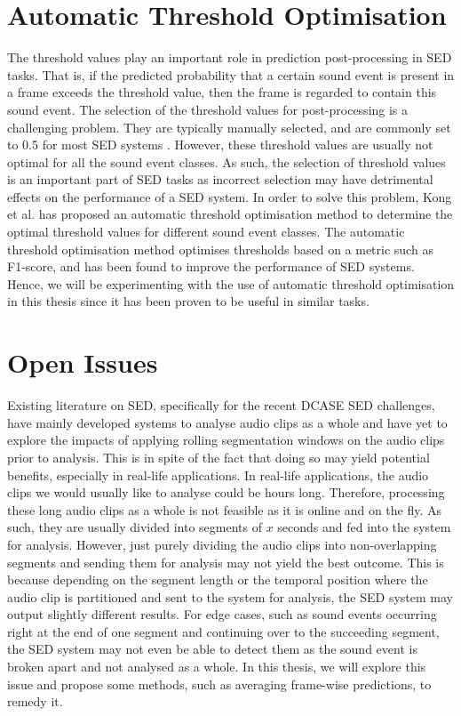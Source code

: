 \section{Automatic Threshold Optimisation}
The threshold values play an important role in prediction post-processing in SED tasks. That is, if the predicted probability that a certain sound event is present in a frame exceeds the threshold value, then the frame is regarded to contain this sound event. The selection of the threshold values for post-processing is a challenging problem. They are typically manually selected, and are commonly set to 0.5 for most SED systems \cite{const_thres}. However, these threshold values are usually not optimal for all the sound event classes. As such, the selection of threshold values is an important part of SED tasks as incorrect selection may have detrimental effects on the performance of a SED system. In order to solve this problem, Kong et al. \cite{kong2020sound} has proposed an automatic threshold optimisation method to determine the optimal threshold values for different sound event classes. The automatic threshold optimisation method optimises thresholds based on a metric such as F1-score, and  has been found to improve the performance of SED systems. Hence, we will be experimenting with the use of automatic threshold optimisation in this thesis since it has been proven to be useful in similar tasks.

\section{Open Issues}
Existing literature on SED, specifically for the recent DCASE SED challenges, have mainly developed systems to analyse audio clips as a whole and have yet to explore the impacts of applying rolling segmentation windows on the audio clips prior to analysis. This is in spite of the fact that doing so may yield potential benefits, especially in real-life applications. In real-life applications, the audio clips we would usually like to analyse could be hours long. Therefore, processing these long audio clips as a whole is not feasible as it is online and on the fly. As such, they are usually divided into segments of \(x\) seconds and fed into the system for analysis. However, just purely dividing the audio clips into non-overlapping segments and sending them for analysis may not yield the best outcome. This is because depending on the segment length or the temporal position where the audio clip is partitioned and sent to the system for analysis, the SED system may output slightly different results. For edge cases, such as sound events occurring right at the end of one segment and continuing over to the succeeding segment, the SED system may not even be able to detect them as the sound event is broken apart and not analysed as a whole. In this thesis, we will explore this issue and propose some methods, such as averaging frame-wise predictions, to remedy it.


